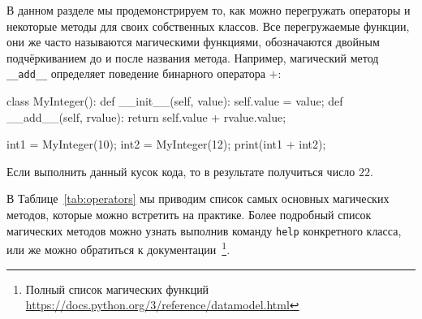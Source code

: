 В данном разделе мы продемонстрируем то, как можно перегружать
операторы и некоторые методы для своих собственных классов. 
Все перегружаемые функции, они же часто называются магическими 
функциями, обозначаются двойным подчёркиванием до и после 
названия метода. Например, магический метод \texttt{\_\_add\_\_} 
определяет поведение бинарного оператора $+$:

\begin{python}
class MyInteger():
	def __init__(self, value):
		self.value = value;
	def __add__(self, rvalue):
		return self.value + rvalue.value;

int1 = MyInteger(10);
int2 = MyInteger(12);
print(int1 + int2);
\end{python}

Если выполнить данный кусок кода, то в результате получиться число $22$.

В Таблице~\ref{tab:operators} мы приводим список самых основных магических 
методов, которые можно встретить на практике. Более подробный список магических 
методов можно узнать выполнив команду \texttt{help} конкретного класса,
или же можно обратиться к документации~\footnote{Полный список магических 
функций \url{https://docs.python.org/3/reference/datamodel.html}}.

